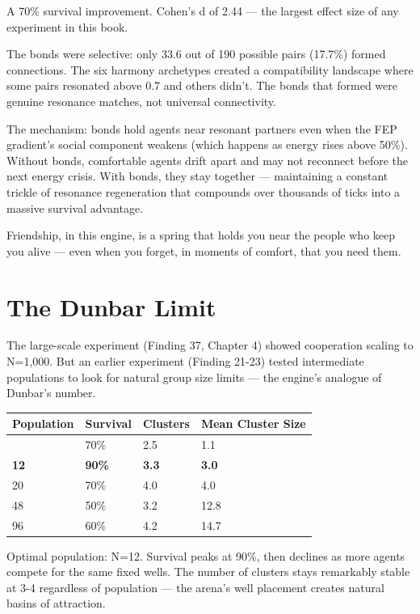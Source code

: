 A 70\% survival improvement. Cohen's d of 2.44 --- the largest effect size of any experiment in this book.

The bonds were selective: only 33.6 out of 190 possible pairs (17.7\%) formed connections. The six harmony archetypes created a compatibility landscape where some pairs resonated above 0.7 and others didn't. The bonds that formed were genuine resonance matches, not universal connectivity.

The mechanism: bonds hold agents near resonant partners even when the FEP gradient's social component weakens (which happens as energy rises above 50\%). Without bonds, comfortable agents drift apart and may not reconnect before the next energy crisis. With bonds, they stay together --- maintaining a constant trickle of resonance regeneration that compounds over thousands of ticks into a massive survival advantage.

Friendship, in this engine, is a spring that holds you near the people who keep you alive --- even when you forget, in moments of comfort, that you need them.

\section{The Dunbar Limit}\label{the-dunbar-limit}

The large-scale experiment (Finding 37, Chapter 4) showed cooperation scaling to N=1,000. But an earlier experiment (Finding 21-23) tested intermediate populations to look for natural group size limits --- the engine's analogue of Dunbar's number.

\begin{longtable}[]{@{}llll@{}}
\toprule\noalign{}
Population & Survival & Clusters & Mean Cluster Size \\
\midrule\noalign{}
\endhead
\bottomrule\noalign{}
\endlastfoot
4 & 70\% & 2.5 & 1.1 \\
\textbf{12} & \textbf{90\%} & \textbf{3.3} & \textbf{3.0} \\
20 & 70\% & 4.0 & 4.0 \\
48 & 50\% & 3.2 & 12.8 \\
96 & 60\% & 4.2 & 14.7 \\
\end{longtable}

Optimal population: N=12. Survival peaks at 90\%, then declines as more agents compete for the same fixed wells. The number of clusters stays remarkably stable at 3-4 regardless of population --- the arena's well placement creates natural basins of attraction.

